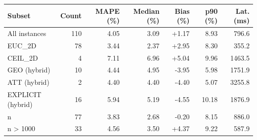 \begin{tabular}{l r r r r r r}
\toprule
Subset & Count & MAPE (\%) & Median (\%) & Bias (\%) & p90 (\%) & Lat. (ms) \\
\midrule
All instances & 110 & 4.05 & 3.09 & +1.17 & 8.93 & 796.6 \\
EUC\_2D & 78 & 3.44 & 2.37 & +2.95 & 8.30 & 355.2 \\
CEIL\_2D & 4 & 7.11 & 6.96 & +5.04 & 9.96 & 1463.5 \\
GEO (hybrid) & 10 & 4.44 & 4.95 & -3.95 & 5.98 & 1751.9 \\
ATT (hybrid) & 2 & 4.40 & 4.40 & -4.40 & 5.07 & 3255.8 \\
EXPLICIT (hybrid) & 16 & 5.94 & 5.19 & -4.55 & 10.18 & 1876.9 \\
n \leq 1000 & 77 & 3.83 & 2.68 & -0.20 & 8.15 & 886.0 \\
n > 1000 & 33 & 4.56 & 3.50 & +4.37 & 9.22 & 587.9 \\
\bottomrule
\end{tabular}
